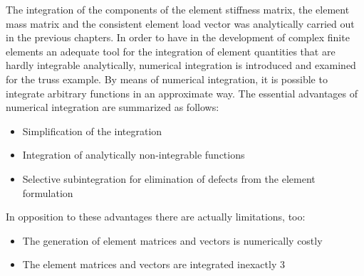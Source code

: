 
The integration of the components of the element stiffness matrix, the element mass matrix and
the consistent element load vector was analytically carried out in the previous chapters. In order to have in the development of complex finite elements an adequate tool for the integration of element quantities that are hardly integrable analytically, numerical integration is introduced
and examined for the truss example. By means of numerical integration, it is possible to integrate arbitrary functions in an approximate way. The essential advantages of numerical integration are summarized as follows:
\begin{itemize}
    \item Simplification of the integration
    \item Integration of analytically non-integrable functions
    \item Selective subintegration for elimination of defects from the element formulation
\end{itemize}
In opposition to these advantages there are actually limitations, too:
\begin{itemize}
    \item The generation of element matrices and vectors is numerically costly
     \item The element matrices and vectors are integrated inexactly 3

\end{itemize}

